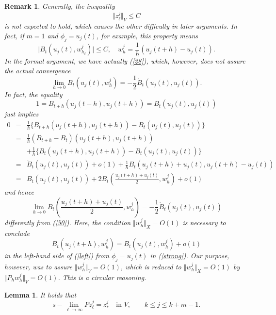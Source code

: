 \documentclass[final,a4paper]{jmsj}
\theoremstyle{thmstyleone}%
\theoremstyle{thmstyletwo}%
\newtheorem{remark}{Remark}%
\theoremstyle{thmstylethree}%
\newtheorem{lemma}[theorem]{Lemma}
\begin{document}
\begin{remark}\label{rem9} 
Generally, the inequality 
\[ \Vert z_\ell^j\Vert_V\leq C \] 
is not expected to hold, which causes the other difficulty in later arguments. In fact, if $m=1$ and $\phi_j=u_j(t)$, for example, this property means  
\[ \vert B_t(u_j(t), w_{h_\ell}^j)\vert \leq C, \quad w_h^j=\frac{1}{h}(u_j(t+h)-u_j(t)). \] 
In the formal argument, we have actually (\ref{28}), which, however, does not assure the actual convergence   
\begin{equation} 
\lim_{h\rightarrow 0}B_t(u_j(t), w_h^j)=-\frac{1}{2}\dot B_t(u_j(t), u_j(t)).  
 \label{50}
\end{equation} 
In fact, the equality  
\[ 1=B_{t+h}(u_j(t+h), u_j(t+h))=B_t(u_j(t), u_j(t)) \] 
just implies  
\begin{eqnarray*} 
0 & = & \frac{1}{h}\{ B_{t+h}(u_j(t+h), u_j(t+h))-B_t(u_j(t),u_j(t))\} \\ 
& = & \frac{1}{h}(B_{t+h}-B_t)(u_j(t+h), u_j(t+h)) \\ 
& & +\frac{1}{h}\{ B_t(u_j(t+h), u_j(t+h))-B_t(u_j(t), u_j(t))\} \\ 
& = & \dot B_t(u_j(t),u_j(t))+o(1)+\frac{1}{h}B_t(u_j(t+h)+u_j(t), u_j(t+h)-u_j(t)) \\ 
& = & \dot B_t(u_j(t),u_j(t))+2B_t(\frac{u_j(t+h)+u_j(t)}{2}, w_h^j) +o(1)
\end{eqnarray*} 
and hence 
\begin{equation} 
\lim_{h\rightarrow 0}B_t(\frac{u_j(t+h)+u_j(t)}{2}, w_h^j)=-\frac{1}{2}\dot B_t(u_j(t), u_j(t)) 
 \label{left}
\end{equation}   
differently from (\ref{50}).  Here, the condition $\Vert w_h^j\Vert_X=O(1)$ is necessary to conclude 
\[ B_t(u_j(t+h), w_h^j)=B_t(u_j(t), w_h^j)+o(1) \] 
in the left-hand side of (\ref{left}) from $\phi_j=u_j(t)$ in (\ref{strong}). Our purpose, however, was to assure $\Vert w_h^j\Vert_V=O(1)$, which is reduced to $\Vert w_h^j\Vert_X=O(1)$ by $\Vert P_hw_h^j\Vert_V=O(1)$. This is a circular reasoning.   
\end{remark} 





\begin{lemma}\label{lem9}
It holds that 
\[ \mbox{s}-\lim_{\ell\rightarrow \infty}Pz_{\ell}^j=z_\ast^j \quad \mbox{in $V$}, \qquad k\leq j\leq k+m-1. \] 
\end{lemma} 
\end{document}
